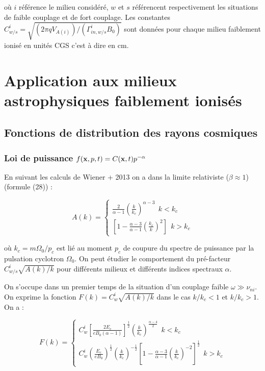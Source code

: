 \documentclass[10pt,a4paper]{article}
\begin{document}
où $i$ référence le milieu considéré, $w$ et $s$ référencent respectivement les situations de faible couplage et de fort couplage. Les constantes $C^i_{w/s} = \sqrt{(2\pi q V_{A(i)})/(\Gamma^i_{in,{w/s}} B_0)}$ sont données pour chaque milieu faiblement ionisé en unités CGS c'est à dire en $\mathrm{cm}$. 

\section*{Application aux milieux astrophysiques faiblement ionisés} 

\subsection*{Fonctions de distribution des rayons cosmiques} 

\subsubsection*{Loi de puissance $f(\vb{x}, p, t) = C(\vb{x}, t) p^{-\alpha}$}

En suivant les calculs de Wiener + 2013 on a dans la limite relativiste ($\beta \approx 1$) (formule (28)) : 

\begin{equation}
A(k) = \left\{
\begin{array}{rl}
  \frac{2}{\alpha - 1} \left( \frac{k}{k_c} \right)^{\alpha - 3} ~~ k < k_c \\
  \left[1 - \frac{\alpha - 3}{\alpha - 1} \left( \frac{k_c}{k} \right)^2 \right] ~~ k > k_c 
\end{array}
\right.
\end{equation}

où $k_c = m\Omega_0/p_c$ est lié au moment $p_c$ de coupure du spectre de puissance par la pulsation cyclotron $\Omega_0$. On peut étudier le comportement du pré-facteur $C^i_{w/s} \sqrt{A(k)/k}$ pour différents milieux et différents indices spectraux $\alpha$.

On s'occupe dans un premier temps de la situation d'un couplage faible $\omega \gg \nu_{ni}$. On exprime la fonction $F(k) = C^i_{w}\sqrt{A(k)/k}$ dans le cas $k/k_c < 1$ et $k/k_c > 1$. On a  : 

\begin{equation}
F(k)  =  \left\{
\begin{array}{rl}
  C^i_{w} \left[\frac{2E_c}{eB_0(\alpha - 1)} \right]^{\frac{1}{2}} \left( \frac{k}{k_c} \right)^{\frac{\alpha - 4}{2}} ~~ k < k_c \\
  C^i_{w} \left( \frac{E_c}{eB_0} \right)^\frac{1}{2} \left( \frac{k}{k_c} \right)^{-\frac{1}{2}} \left [ 1 - \frac{\alpha - 3}{\alpha - 1} \left( \frac{k}{k_c} \right)^{-2} \right]^{\frac{1}{2}} ~~ k > k_c 
\end{array}
\right.
\end{equation}
\end{document}
